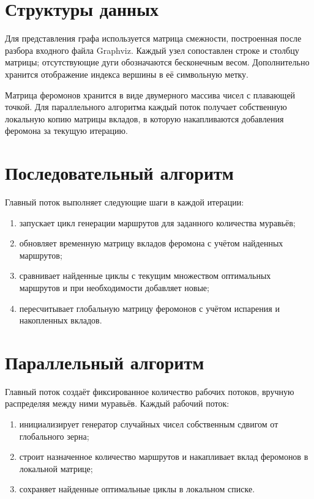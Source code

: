 
\section*{Структуры данных}
Для представления графа используется матрица смежности, построенная после разбора входного
файла Graphviz. Каждый узел сопоставлен строке и столбцу матрицы; отсутствующие дуги
обозначаются бесконечным весом. Дополнительно хранится отображение индекса вершины в её
символьную метку.

Матрица феромонов хранится в виде двумерного массива чисел с плавающей точкой. Для
параллельного алгоритма каждый поток получает собственную локальную копию матрицы вкладов,
в которую накапливаются добавления феромона за текущую итерацию.

\section*{Последовательный алгоритм}
Главный поток выполняет следующие шаги в каждой итерации:
\begin{enumerate}
        \item запускает цикл генерации маршрутов для заданного количества муравьёв;
        \item обновляет временную матрицу вкладов феромона с учётом найденных маршрутов;
        \item сравнивает найденные циклы с текущим множеством оптимальных маршрутов и при необходимости добавляет новые;
        \item пересчитывает глобальную матрицу феромонов с учётом испарения и накопленных вкладов.
\end{enumerate}

\section*{Параллельный алгоритм}
Главный поток создаёт фиксированное количество рабочих потоков, вручную распределяя между
ними муравьёв. Каждый рабочий поток:
\begin{enumerate}
        \item инициализирует генератор случайных чисел собственным сдвигом от глобального зерна;
        \item строит назначенное количество маршрутов и накапливает вклад феромонов в локальной матрице;
        \item сохраняет найденные оптимальные циклы в локальном списке.
\end{enumerate}

